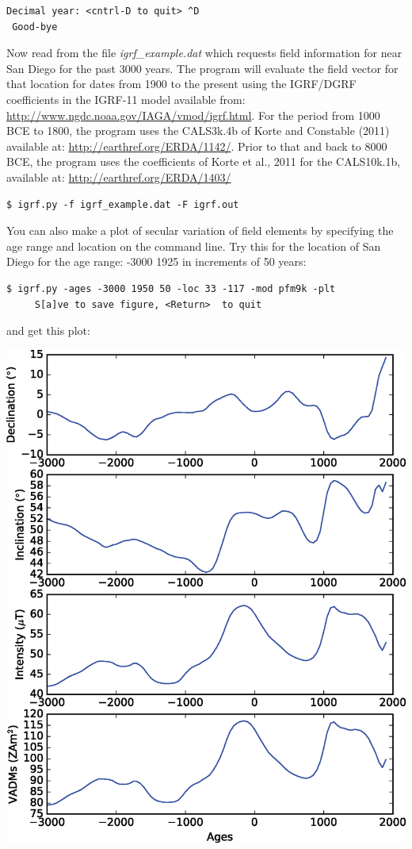\documentclass[11pt]{book}
\begin{document}
{{\begin{verbatim}
Decimal year: <cntrl-D to quit> ^D
 Good-bye
\end{verbatim}

Now read from the file {\it igrf\_example.dat} which requests field information for near San Diego for the past 3000 years.  The program will evaluate the field vector for that location for dates from 1900 to the present using the IGRF/DGRF coefficients in the IGRF-11 model available from:
\url{http://www.ngdc.noaa.gov/IAGA/vmod/igrf.html}.   For the period from 1000 BCE to 1800, the program uses the CALS3k.4b of Korte and Constable (2011) \nocite{korte11a} available at: \url{http://earthref.org/ERDA/1142/}.    Prior to that and back to 8000 BCE, the program uses the coefficients of Korte et al., 2011 \nocite{korte11b} for the CALS10k.1b, available at:
\url{http://earthref.org/ERDA/1403/}

\begin{verbatim}
$ igrf.py -f igrf_example.dat -F igrf.out
\end{verbatim}

You can also make a plot of secular variation of field elements by specifying the age range and location on the command line.  Try this for the location of San Diego for the age range: -3000 1925 in increments of 50 years:

\begin{verbatim}
$ igrf.py -ages -3000 1950 50 -loc 33 -117 -mod pfm9k -plt
     S[a]ve to save figure, <Return>  to quit
\end{verbatim}

and get this plot:


  \includegraphics[width=15cm]{EPSfiles/igrf.eps}

}}
\end{document}
